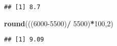 \documentclass[
]{article}
\newenvironment{Shaded}{\begin{snugshade}}{\end{snugshade}}
\newcommand{\DecValTok}[1]{\textcolor[rgb]{0.00,0.00,0.81}{#1}}
\newcommand{\KeywordTok}[1]{\textcolor[rgb]{0.13,0.29,0.53}{\textbf{#1}}}
\newcommand{\NormalTok}[1]{#1}
\newcommand{\OperatorTok}[1]{\textcolor[rgb]{0.81,0.36,0.00}{\textbf{#1}}}
\newcommand{\StringTok}[1]{\textcolor[rgb]{0.31,0.60,0.02}{#1}}
\begin{document}
\begin{verbatim}
## [1] 8.7
\end{verbatim}

\begin{Shaded}
\begin{Highlighting}[]
\KeywordTok{round}\NormalTok{(((}\DecValTok{6000-5500}\NormalTok{)}\OperatorTok{/}\StringTok{ }\DecValTok{5500}\NormalTok{)}\OperatorTok{*}\DecValTok{100}\NormalTok{,}\DecValTok{2}\NormalTok{)}
\end{Highlighting}
\end{Shaded}

\begin{verbatim}
## [1] 9.09
\end{verbatim}
\end{document}
